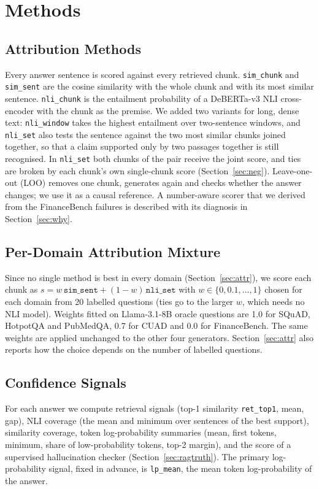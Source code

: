 \documentclass[conference]{IEEEtran}
\newcommand{\m}[1]{\texttt{#1}}   %
\begin{document}
\section{Methods}
\label{sec:methods}

\subsection{Attribution Methods}
Every answer sentence is scored against every retrieved chunk. \m{sim\_chunk} and \m{sim\_sent} are the cosine similarity with the whole chunk and with
its most similar sentence. \m{nli\_chunk} is the entailment probability of a DeBERTa-v3 NLI cross-encoder \cite{he2023debertav3} with the chunk as the
premise. We added two variants for long, dense text: \m{nli\_window} takes the highest entailment over two-sentence windows, and \m{nli\_set} also tests
the sentence against the two most similar chunks joined together, so that a claim supported only by two passages together is still recognised. In
\m{nli\_set} both chunks of the pair receive the joint score, and ties are broken by each chunk's own single-chunk score
(Section~\ref{sec:neg}). Leave-one-out (LOO) removes one chunk, generates again and checks whether the answer changes; we use it as a causal reference.
A number-aware scorer that we derived from the FinanceBench failures is described with its diagnosis in Section~\ref{sec:why}.

\subsection{Per-Domain Attribution Mixture}
Since no single method is best in every domain (Section~\ref{sec:attr}), we score each chunk as
$s = w\,\m{sim\_sent} + (1-w)\,\m{nli\_set}$ with $w\in\{0,0.1,\dots,1\}$ chosen for each domain from 20 labelled questions (ties go to the larger
$w$, which needs no NLI model). Weights fitted on Llama-3.1-8B oracle questions are 1.0 for SQuAD, HotpotQA and PubMedQA, 0.7 for CUAD and 0.0 for
FinanceBench. The same weights are applied unchanged to the other four generators. Section~\ref{sec:attr} also reports how the choice depends on
the number of labelled questions.

\subsection{Confidence Signals}
For each answer we compute retrieval signals (top-1 similarity \m{ret\_top1}, mean, gap), NLI coverage (the mean and minimum over sentences of the best
support), similarity coverage, token log-probability summaries (mean, first tokens, minimum, share of low-probability tokens, top-2 margin), and the score
of a supervised hallucination checker (Section~\ref{sec:ragtruth}). The primary log-probability signal, fixed in advance, is \m{lp\_mean}, the mean token
log-probability of the answer.
\end{document}
